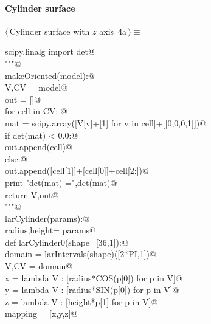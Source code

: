\documentclass[11pt,oneside]{article}	%
\begin{document}
\paragraph{Cylinder surface}
\begin{flushleft} \small \label{scrap8}
\protect{}$\langle\,$Cylinder surface with $z$ axis\nobreak\ {\footnotesize 4a}$\,\rangle\equiv$
\vspace{-1ex}
\begin{list}{}{} \item
\mbox{}\verb@from scipy.linalg import det@\\
\mbox{}\verb@"""@\\
\mbox{}\verb@def makeOriented(model):@\\
\mbox{}\verb@   V,CV = model@\\
\mbox{}\verb@   out = []@\\
\mbox{}\verb@   for cell in CV: @\\
\mbox{}\verb@      mat = scipy.array([V[v]+[1] for v in cell]+[[0,0,0,1]])@\\
\mbox{}\verb@      if det(mat) < 0.0:@\\
\mbox{}\verb@         out.append(cell)@\\
\mbox{}\verb@      else:@\\
\mbox{}\verb@         out.append([cell[1]]+[cell[0]]+cell[2:])@\\
\mbox{}\verb@      print "\n det(mat) =",det(mat)@\\
\mbox{}\verb@   return V,out@\\
\mbox{}\verb@"""@\\
\mbox{}\verb@def larCylinder(params):@\\
\mbox{}\verb@   radius,height= params@\\
\mbox{}\verb@   def larCylinder0(shape=[36,1]):@\\
\mbox{}\verb@      domain = larIntervals(shape)([2*PI,1])@\\
\mbox{}\verb@      V,CV = domain@\\
\mbox{}\verb@      x = lambda V : [radius*COS(p[0]) for p in V]@\\
\mbox{}\verb@      y = lambda V : [radius*SIN(p[0]) for p in V]@\\
\mbox{}\verb@      z = lambda V : [height*p[1] for p in V]@\\
\mbox{}\verb@      mapping = [x,y,z]@\\

\end{list}
\end{flushleft}
\end{document}
